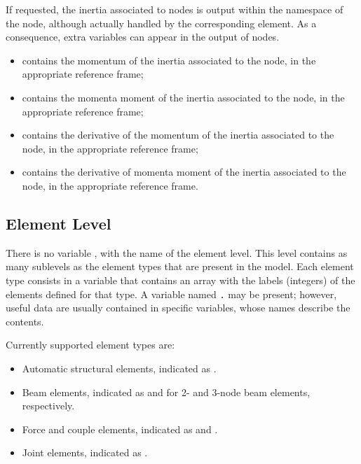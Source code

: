 If requested, the inertia associated to  nodes is output
within the namespace of the node, although actually handled
by the corresponding  element.
As a consequence, extra variables can appear in the output
of  nodes.
\begin{itemize}
\item {} contains the momentum of the inertia
associated to the node, in the appropriate reference frame;

\item {} contains the momenta moment of the inertia
associated to the node, in the appropriate reference frame;

\item {} contains the derivative of the momentum
of the inertia associated to the node, in the appropriate reference frame;

\item {} contains the derivative of momenta moment
of the inertia associated to the node, in the appropriate reference frame.
\end{itemize}


\subsection{Element Level}
There is no variable , with the name of the element level.
This level contains as many sublevels as the element types
that are present in the model.
Each element type consists in a variable that contains an array
with the labels (integers) of the elements defined for that type.
A variable named \texttt{.} may be present; however,
useful data are usually contained in specific variables,
whose names describe the contents.

Currently supported element types are:
\begin{itemize}
\item Automatic structural elements, indicated as .
\item Beam elements, indicated as  and 
for 2- and 3-node beam elements, respectively.
\item Force and couple elements, indicated as  and .
\item Joint elements, indicated as .
\end{itemize}


